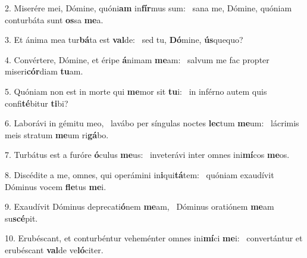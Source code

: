 2. Miserére mei, Dómine, quóni\textbf{am} in\textbf{fír}mus sum: \ast\  sana me, Dómine, quóniam conturbáta sunt \textbf{os}sa \textbf{me}a.\

3. Et ánima mea tur\textbf{bá}ta est \textbf{val}de: \ast\  sed tu, \textbf{Dó}mine, \textbf{ús}quequo?\

4. Convértere, Dómine, et éripe \textbf{á}nimam \textbf{me}am: \ast\  salvum me fac propter miseri\textbf{cór}diam \textbf{tu}am.\

5. Quóniam non est in morte qui \textbf{me}mor sit \textbf{tu}i: \ast\  in inférno autem quis confi\textbf{té}bitur \textbf{ti}bi?\

6. Laborávi in gémitu meo, \dag\  lavábo per síngulas noctes \textbf{lec}tum \textbf{me}um: \ast\  lácrimis meis stratum \textbf{me}um ri\textbf{gá}bo.\

7. Turbátus est a furóre \textbf{ó}culus \textbf{me}us: \ast\  inveterávi inter omnes ini\textbf{mí}cos \textbf{me}os.\

8. Discédite a me, omnes, qui operámini in\textbf{i}qui\textbf{tá}tem: \ast\  quóniam exaudívit Dóminus vocem \textbf{fle}tus \textbf{me}i.\

9. Exaudívit Dóminus deprecati\textbf{ó}nem \textbf{me}am, \ast\  Dóminus oratiónem \textbf{me}am su\textbf{scé}pit.\

10. Erubéscant, et conturbéntur veheménter omnes ini\textbf{mí}ci \textbf{me}i: \ast\  convertántur et erubéscant \textbf{val}de ve\textbf{ló}citer.\

